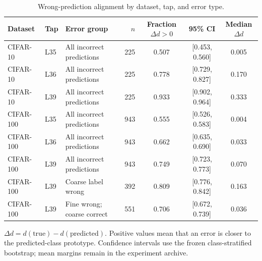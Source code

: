 \begin{table}[!htbp]
\centering
\begin{threeparttable}
\caption{Wrong-prediction alignment by dataset, tap, and error type.}
\label{tab:pca-wrong-alignment-main}
\footnotesize
\setlength{\tabcolsep}{3.5pt}
\renewcommand{\arraystretch}{1.06}
\begin{tabularx}{\linewidth}{@{}l l Y r c c c@{}}
\toprule
Dataset & Tap & Error group & $n$ & Fraction $\Delta d>0$ & 95\% CI & Median $\Delta d$\\
\midrule
CIFAR-10 & L35 & All incorrect predictions & 225 & 0.507 & [0.453, 0.560] & 0.005\\
\thinrowrule
CIFAR-10 & L36 & All incorrect predictions & 225 & 0.778 & [0.729, 0.827] & 0.170\\
\thinrowrule
CIFAR-10 & L39 & All incorrect predictions & 225 & 0.933 & [0.902, 0.964] & 0.333\\
\midrule
CIFAR-100 & L35 & All incorrect predictions & 943 & 0.555 & [0.526, 0.583] & 0.004\\
\thinrowrule
CIFAR-100 & L36 & All incorrect predictions & 943 & 0.662 & [0.635, 0.690] & 0.033\\
\thinrowrule
CIFAR-100 & L39 & All incorrect predictions & 943 & 0.749 & [0.723, 0.773] & 0.070\\
\midrule
CIFAR-100 & L39 & Coarse label wrong & 392 & 0.809 & [0.776, 0.842] & 0.163\\
\thinrowrule
CIFAR-100 & L39 & Fine wrong; coarse correct & 551 & 0.706 & [0.672, 0.739] & 0.036\\
\bottomrule
\end{tabularx}
\begin{tablenotes}[flushleft]\footnotesize
\item $\Delta d=d(\mathrm{true})-d(\mathrm{predicted})$. Positive values mean that an error is closer to the predicted-class prototype. Confidence intervals use the frozen class-stratified bootstrap; mean margins remain in the experiment archive.
\end{tablenotes}
\end{threeparttable}
\end{table}
